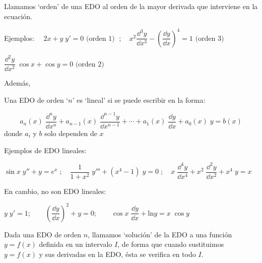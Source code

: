 \begin{cuadro-naranja}
	
\begin{defi}
Llamamos `orden' de una EDO al orden de la mayor derivada que interviene en la ecuación. 
\end{defi}
\end{cuadro-naranja}

\begin{cuadro-gris}


Ejemplos: $\quad 2x+y\; y'=0 \text{ (orden 1) }\; ; \quad x^2 \dfrac {\dd^3 y}{\dd x^3}- \left( \dfrac {\dd y}{\dd x} \right)^4=1 \text{ (orden 3) }\; $

$ \dfrac {\dd^2 y}{\dd x^2}\; \cos x + \cos y =0 \text{ (orden 2) } $
\end{cuadro-gris}

Además,

\begin{cuadro-naranja}
	
\begin{defi}
Una EDO de orden `$n$' es `lineal' si se puede escribir en la forma:

\begin{equation}
	a_n(x)\; \dfrac {\dd^n y}{\dd x^n}+a_{n-1}(x)\; \dfrac {\dd^{n-1} y}{\dd x^{n-1}}+ \cdots + a_1(x)\;  \dfrac {\dd y}{\dd x}+a_0(x)\; y=b(x)
\end{equation}	
donde $a_i$ y $b$ solo dependen de $x$
\end{defi}
\end{cuadro-naranja}

\begin{cuadro-gris}

Ejemplos de EDO lineales:

$\sin x \; y''+y=e^x\; ; \quad \dfrac {1}{1+x^2}\; y'''+ (x^4-1)\; y=0\; ; \quad x\; \dfrac {\dd^4 y}{\dd x^4}+ x^2 \; \dfrac {\dd^2 y}{\dd x^2}+x^4\; y = x$

En cambio, no son EDO lineales:

$y\; y'=1;\qquad  \left( \dfrac{\dd y}{\dd x} \right)^2+y=0; \qquad \cos x\; \dfrac {\dd y}{\dd x}+\mathrm{ln} y=x\; \cos y$
	
\end{cuadro-gris}

\begin{cuadro-naranja}

\begin{defi}
Dada una EDO de orden $n$, llamamos `solución'	de la EDO a una función $y=f(x)$ definida en un intervalo $I$, de forma que cuando sustituimos $y=f(x)$ y sus derivadas en la EDO, ésta se verifica en todo $I$.
\end{defi}
\end{cuadro-naranja}

